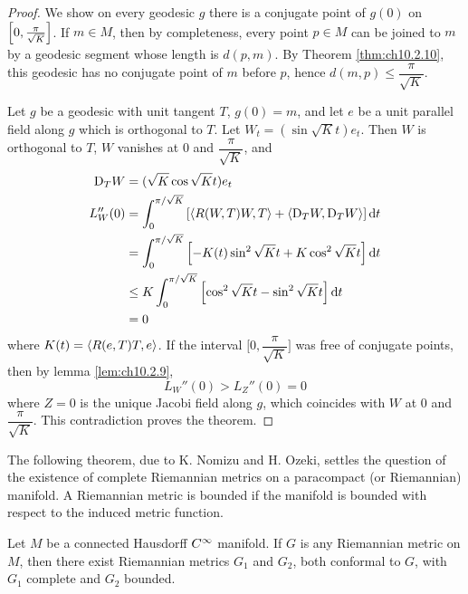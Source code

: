\documentclass[../main]{subfiles}
\begin{document}
\begin{proof}
We show on every geodesic $g$ there is a conjugate point of $g(0)$ on $\left[0,\frac\pi{\sqrt K}\right]$. If $m\in M$, then by completeness, every point $p\in M$ can be joined to $m$ by a geodesic segment whose length is $d(p,m)$. By Theorem \ref{thm:ch10.2.10}, this geodesic has no conjugate point of $m$ before $p$, hence $d(m,p)\le\dfrac\pi{\sqrt K}$.

Let $g$ be a geodesic with unit tangent $T$, $g(0)=m$, and let $e$ be a unit parallel field along $g$ which is orthogonal to $T$. Let $W_t=(\sin\sqrt Kt)e_t$. Then $W$ is orthogonal to $T$, $W$ vanishes at 0 and $\dfrac\pi{\sqrt K}$, and
\begin{align*}
\mathrm{D}_TW &= (\sqrt K\cos\sqrt Kt)e_t \\
L_W''(0) &= \int_0^{\pi/\sqrt K}\left[\left\langle R(W,T)W,T\right\rangle+\left\langle\mathrm{D}_TW,\mathrm{D}_TW\right\rangle\right]\mathrm{d}t \\
&= \int_0^{\pi/\sqrt K}\left[-K(t)\sin^2\sqrt Kt+K\cos^2\sqrt Kt\right]\mathrm{d}t \\
&\le K\int_0^{\pi/\sqrt K}\left[\cos^2\sqrt Kt-\sin^2\sqrt Kt\right]\mathrm{d}t \\
&=0
\end{align*}
where $K(t)=\left\langle R(e,T)T,e\right\rangle$. If the interval $\Big[0,\dfrac\pi{\sqrt K}\Big]$ was free of conjugate points, then by lemma \ref{lem:ch10.2.9},
\[L_W''(0) > L_Z''(0) = 0\]
where $Z=0$ is the unique Jacobi field along $g$, which coincides with $W$ at 0 and $\dfrac\pi{\sqrt K}$. This contradiction proves the theorem.
\end{proof}



The following theorem, due to K. Nomizu and H. Ozeki, settles the question of the existence of complete Riemannian metrics on a paracompact (or Riemannian) manifold. A Riemannian metric is bounded if the manifold is bounded with respect to the induced metric function.



\begin{theorem} \label{thm:ch10.5.3}
Let $M$ be a connected Hausdorff $C^\infty$ manifold. If $G$ is any Riemannian metric on $M$, then there exist Riemannian metrics $G_1$ and $G_2$, both conformal to $G$, with $G_1$ complete and $G_2$ bounded.
\end{theorem}
\end{document}
